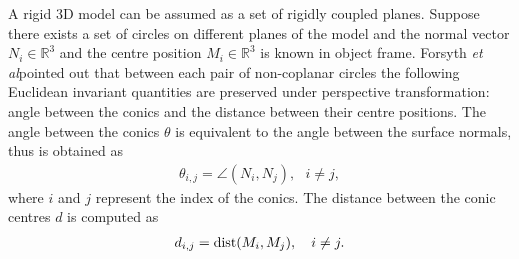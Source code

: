 \documentclass{bmvc2k}
\newcommand{\revise}[2]{\textcolor{red}{\sout{#1}} \textcolor{blue}{#2}}  %
\def\etal{\emph{et al}\bmvaOneDot}
\begin{document}
\par 
A rigid 3D model can be assumed as a set of rigidly coupled planes.
Suppose there exists a set of circles on different planes of the model and the normal vector $N_i \in \mathbb{R}^3$ and the centre position $M_i \in \mathbb{R}^3$ is known in object frame.
Forsyth \etal pointed out that between each pair of non-coplanar circles the following Euclidean invariant quantities are preserved under perspective transformation: angle between the conics and the distance between their centre positions.
The angle between the conics $\theta$ is equivalent to the angle between the surface normals, thus is obtained as
\begin{align}
\theta_{i,j} = \angle(N_i,N_j),~~~i \neq j,
\label{eq:invTheta3d}
\end{align}
where $i$ and $j$ represent the index of the conics.
The distance between the conic centres $d$ is computed as
\begin{align}
d_{i,j} = {\rm dist}(M_i,M_j),~~~i \neq j.
\label{eq:invD3d}
\end{align} 
\end{document}
